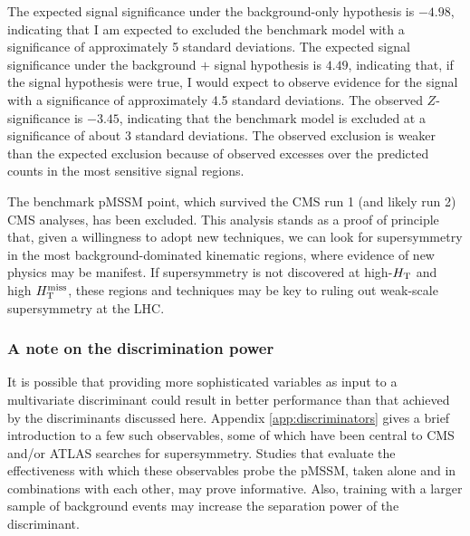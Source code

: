 The expected signal significance under the background-only hypothesis is $-4.98$, indicating that I am expected to excluded the benchmark model with a significance of approximately 5 standard deviations. The expected signal significance under the background $+$ signal hypothesis is $4.49$, indicating that, if the signal hypothesis were true, I would expect to observe evidence for the signal with a significance of approximately 4.5 standard deviations. The observed $Z$-significance is $-3.45$, indicating that the benchmark model is excluded at a significance of about 3 standard deviations. The observed exclusion is weaker than the expected exclusion because of observed excesses over the predicted counts in the most sensitive signal regions.

The benchmark pMSSM point, which survived the CMS run 1 (and likely run 2) CMS analyses, has been excluded. This analysis stands as a proof of principle that, given a willingness to adopt new techniques, we can look for supersymmetry in the most background-dominated kinematic regions, where evidence of new physics may be manifest. If supersymmetry is not discovered at high-$H_{\rm T}$ and high $H_{\text{T}}^{\rm miss}$, these regions and techniques may be key to ruling out weak-scale supersymmetry at the LHC.


\subsubsection{A note on the discrimination power}
It is possible that providing more sophisticated variables as input to a multivariate discriminant could result in better performance than that achieved by the discriminants discussed here. Appendix \ref{app:discriminators} gives a brief introduction to a few such observables, some of which have been central to CMS and/or ATLAS searches for supersymmetry. Studies that evaluate the effectiveness with which these observables probe the pMSSM, taken alone and in combinations with each other, may prove informative. Also, training with a larger sample of background events may increase the separation power of the discriminant. 




